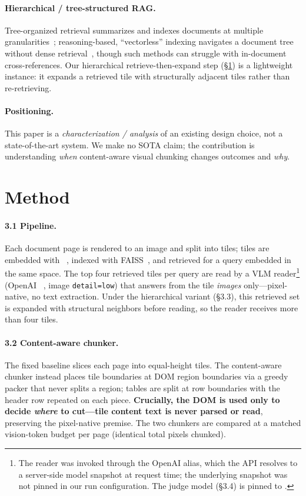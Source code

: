 \documentclass[11pt]{article}
\begin{document}
\paragraph{Hierarchical / tree-structured RAG.} Tree-organized retrieval summarizes and indexes documents
at multiple granularities~\citep{raptor}; reasoning-based, ``vectorless'' indexing navigates a document
tree without dense retrieval~\citep{pageindex}, though such methods can struggle with in-document
cross-references. Our hierarchical retrieve-then-expand step (\S\ref{sec:method}) is a lightweight
instance: it expands a retrieved tile with structurally adjacent tiles rather than re-retrieving.

\paragraph{Positioning.} This paper is a \emph{characterization / analysis} of an existing design choice,
not a state-of-the-art system. We make no SOTA claim; the contribution is understanding \emph{when}
content-aware visual chunking changes outcomes and \emph{why}.

\section{Method}\label{sec:method}
\paragraph{3.1 Pipeline.} Each document page is rendered to an image and split into tiles; tiles are
embedded with \EmbedModel~\citep{qwen3vl}, indexed with FAISS~\citep{faiss}, and retrieved for a query
embedded in the same space. The top four retrieved tiles per query are read by a VLM reader\footnote{The reader was invoked
through the OpenAI \texttt{\ReaderModel} alias, which the API resolves to a server-side model snapshot at
request time; the underlying snapshot was not pinned in our run configuration. The judge model
(\S3.4) is pinned to \texttt{\JudgeModel}.} (OpenAI \texttt{\ReaderModel}~\citep{gpt4o},
image \texttt{detail=low}) that answers from the tile \emph{images} only---pixel-native, no text extraction.
Under the hierarchical variant (\S3.3), this retrieved set is expanded with structural neighbors before
reading, so the reader receives more than four tiles.

\paragraph{3.2 Content-aware chunker.} The fixed baseline slices each page into equal-height tiles. The
content-aware chunker instead places tile boundaries at DOM region boundaries via a greedy packer that
never splits a region; tables are split at row boundaries with the header row repeated on each piece.
\textbf{Crucially, the DOM is used only to decide \emph{where} to cut---tile content text is never parsed
or read}, preserving the pixel-native premise. The two chunkers are compared at a matched vision-token
budget per page (identical total pixels chunked).
\end{document}
